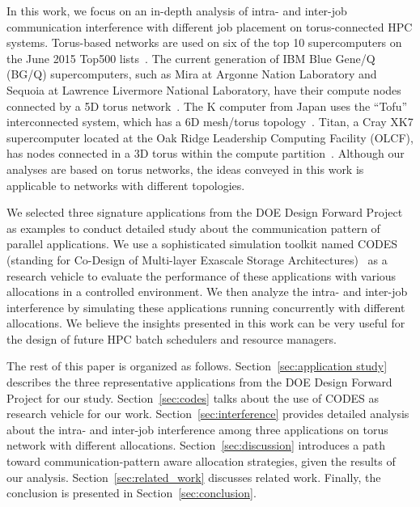 In this work, we focus on an in-depth analysis of intra- and inter-job 
communication interference with different job placement on torus-connected HPC systems. 
Torus-based networks are used on six of the top 10 supercomputers 
on the June 2015 Top500 lists~\cite{top500}. 
The current generation of IBM Blue Gene/Q (BG/Q) supercomputers, 
such as Mira at Argonne Nation Laboratory and 
Sequoia at Lawrence Livermore National Laboratory, 
have their compute nodes connected by a 5D torus network~\cite{bgq}. 
The K computer from Japan uses the ``Tofu'' interconnected system, 
which has a 6D mesh/torus topology~\cite{tofu}. 
Titan, a Cray XK7 supercomputer located at the Oak Ridge Leadership Computing Facility (OLCF), 
has nodes connected in a 3D torus within the compute partition~\cite{titan}. 
Although our analyses are based on torus networks, 
the ideas conveyed in this work is applicable to networks with different topologies. 

We selected three signature applications from 
the DOE Design Forward Project~\cite{designforwardwebpage} as examples 
to conduct detailed study about the communication pattern of parallel applications. 
We use a sophisticated simulation toolkit named CODES 
(standing for Co-Design of Multi-layer Exascale Storage Architectures)~\cite{Jason-2011} 
as a research vehicle to evaluate the performance of these applications 
with various allocations in a controlled environment. 
We then analyze the intra- and inter-job interference 
by simulating these applications running concurrently with different allocations. 
We believe the insights presented in this work can be very useful 
for the design of future HPC batch schedulers and resource managers.


The rest of this paper is organized as follows. 
Section~\ref{sec:application study} describes the three representative applications 
from the DOE Design Forward Project for our study. 
Section~\ref{sec:codes} talks about the use of CODES as research vehicle for our work. 
Section~\ref{sec:interference} provides detailed analysis about the intra- and inter-job interference 
among three applications on torus network with different allocations. 
Section~\ref{sec:discussion} introduces a path toward communication-pattern aware allocation strategies, 
given the results of our analysis. 
Section~\ref{sec:related_work} discusses related work. 
Finally, the conclusion is presented in Section~\ref{sec:conclusion}.




